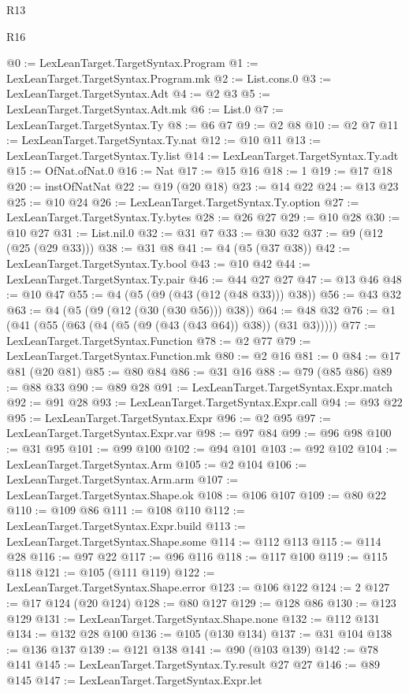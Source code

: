 \begin{lexlean}{R13}
\begin{lexlean}{R16}
\begin{coremodule}
{{{{{{{{{{{{{{{{{{{{{{{{{{{{{{{{{{{{{{{{{{{{{{{{{{{{{{{{{{{{{{{{{{{{{{{{{{{{{{{{{{{{{{{{{{{{{{{{{{{{{{{{{{{{{{{{{@0 := LexLeanTarget.TargetSyntax.Program
@1 := LexLeanTarget.TargetSyntax.Program.mk
@2 := List.cons.{0}
@3 := LexLeanTarget.TargetSyntax.Adt
@4 := @2 @3
@5 := LexLeanTarget.TargetSyntax.Adt.mk
@6 := List.{0}
@7 := LexLeanTarget.TargetSyntax.Ty
@8 := @6 @7
@9 := @2 @8
@10 := @2 @7
@11 := LexLeanTarget.TargetSyntax.Ty.nat
@12 := @10 @11
@13 := LexLeanTarget.TargetSyntax.Ty.list
@14 := LexLeanTarget.TargetSyntax.Ty.adt
@15 := OfNat.ofNat.{0}
@16 := Nat
@17 := @15 @16
@18 := 1
@19 := @17 @18
@20 := instOfNatNat
@22 := @19 (@20 @18)
@23 := @14 @22
@24 := @13 @23
@25 := @10 @24
@26 := LexLeanTarget.TargetSyntax.Ty.option
@27 := LexLeanTarget.TargetSyntax.Ty.bytes
@28 := @26 @27
@29 := @10 @28
@30 := @10 @27
@31 := List.nil.{0}
@32 := @31 @7
@33 := @30 @32
@37 := @9 (@12 (@25 (@29 @33)))
@38 := @31 @8
@41 := @4 (@5 (@37 @38))
@42 := LexLeanTarget.TargetSyntax.Ty.bool
@43 := @10 @42
@44 := LexLeanTarget.TargetSyntax.Ty.pair
@46 := @44 @27 @27
@47 := @13 @46
@48 := @10 @47
@55 := @4 (@5 (@9 (@43 (@12 (@48 @33))) @38))
@56 := @43 @32
@63 := @4 (@5 (@9 (@12 (@30 (@30 @56))) @38))
@64 := @48 @32
@76 := @1 (@41 (@55 (@63 (@4 (@5 (@9 (@43 (@43 @64)) @38)) (@31 @3)))))
@77 := LexLeanTarget.TargetSyntax.Function
@78 := @2 @77
@79 := LexLeanTarget.TargetSyntax.Function.mk
@80 := @2 @16
@81 := 0
@84 := @17 @81 (@20 @81)
@85 := @80 @84
@86 := @31 @16
@88 := @79 (@85 @86)
@89 := @88 @33
@90 := @89 @28
@91 := LexLeanTarget.TargetSyntax.Expr.match
@92 := @91 @28
@93 := LexLeanTarget.TargetSyntax.Expr.call
@94 := @93 @22
@95 := LexLeanTarget.TargetSyntax.Expr
@96 := @2 @95
@97 := LexLeanTarget.TargetSyntax.Expr.var
@98 := @97 @84
@99 := @96 @98
@100 := @31 @95
@101 := @99 @100
@102 := @94 @101
@103 := @92 @102
@104 := LexLeanTarget.TargetSyntax.Arm
@105 := @2 @104
@106 := LexLeanTarget.TargetSyntax.Arm.arm
@107 := LexLeanTarget.TargetSyntax.Shape.ok
@108 := @106 @107
@109 := @80 @22
@110 := @109 @86
@111 := @108 @110
@112 := LexLeanTarget.TargetSyntax.Expr.build
@113 := LexLeanTarget.TargetSyntax.Shape.some
@114 := @112 @113
@115 := @114 @28
@116 := @97 @22
@117 := @96 @116
@118 := @117 @100
@119 := @115 @118
@121 := @105 (@111 @119)
@122 := LexLeanTarget.TargetSyntax.Shape.error
@123 := @106 @122
@124 := 2
@127 := @17 @124 (@20 @124)
@128 := @80 @127
@129 := @128 @86
@130 := @123 @129
@131 := LexLeanTarget.TargetSyntax.Shape.none
@132 := @112 @131
@134 := @132 @28 @100
@136 := @105 (@130 @134)
@137 := @31 @104
@138 := @136 @137
@139 := @121 @138
@141 := @90 (@103 @139)
@142 := @78 @141
@145 := LexLeanTarget.TargetSyntax.Ty.result @27 @27
@146 := @89 @145
@147 := LexLeanTarget.TargetSyntax.Expr.let
}}}}}}}}}}}}}}}}}}}}}}}}}}}}}}}}}}}}}}}}}}}}}}}}}}}}}}}}}}}}}}}}}}}}}}}}}}}}}}}}}}}}}}}}}}}}}}}}}}}}}}}}}}}}}}}}}
\end{coremodule}
\end{lexlean}
\end{lexlean}
